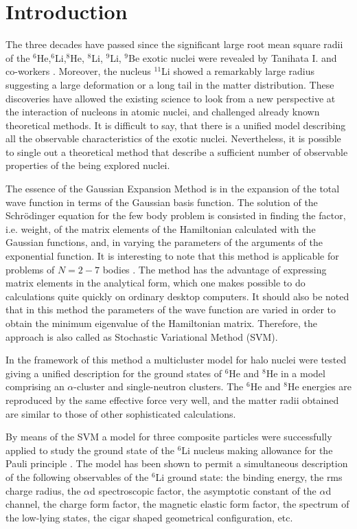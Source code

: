 \documentclass[12pt,a4paper,twoside]{article}
\begin{document}
\section*{Introduction}

The three decades have passed since the significant large root mean square radii of the  $^6$He,$^6$Li,$^8$He, $^8$Li, $^9$Li, $^9$Be 
 exotic nuclei were revealed by Tanihata I. and co-workers \cite{tanihata1985measurements}. Moreover, the nucleus $^{11}$Li showed a remarkably large radius suggesting a large deformation or a long tail in the matter distribution. These discoveries have allowed the existing science to look from a new perspective at the interaction of nucleons in atomic nuclei, and challenged already known theoretical methods. It is difficult to say, that there is a unified model describing all the observable characteristics of the exotic nuclei. Nevertheless, it is possible to single out a theoretical method that describe a sufficient number of observable properties of the being explored nuclei.

The essence of the Gaussian Expansion Method is in the expansion of the total wave function in terms of the Gaussian basis function. The solution of the Schr\"{o}dinger equation for the few body problem is consisted in finding the factor, i.e. weight, of the matrix elements of the Hamiltonian calculated with the Gaussian functions, and, in varying the parameters of the arguments of the exponential function. It is interesting to note that this method is applicable for problems of $N=2-7$ bodies \cite{varga1995precise}. The method has the advantage of expressing matrix elements in the analytical form, which one makes possible to do calculations quite quickly on ordinary desktop computers.
It should also be noted that in this method the parameters of the wave function are varied in order to obtain the minimum eigenvalue of the Hamiltonian matrix. Therefore, the approach is also called as Stochastic Variational Method (SVM).

In the framework of this method a multicluster model \cite{varga1994microscopic} for halo nuclei were tested giving a unified description for the ground states of $^6$He and $^8$He in a model comprising an $\alpha$-cluster and single-neutron clusters. The $^6$He and $^8$He energies are reproduced by the same effective force very well, and the matter radii obtained are similar to those of other sophisticated calculations.

By means of the SVM a model for three composite particles were successfully applied to study the ground state of the $^6$Li nucleus making allowance for the Pauli principle \cite{kukulin1984detailed, kukulin1986detailed}. The model has been shown to permit a simultaneous description of the following observables of the $^6$Li ground state: the binding energy, the rms charge radius, the $\alpha$d spectroscopic factor, the asymptotic constant of the $\alpha$d channel, the charge form factor, the magnetic elastic form factor, the spectrum of the low-lying states,  the cigar shaped geometrical configuration, etc.
\end{document}
